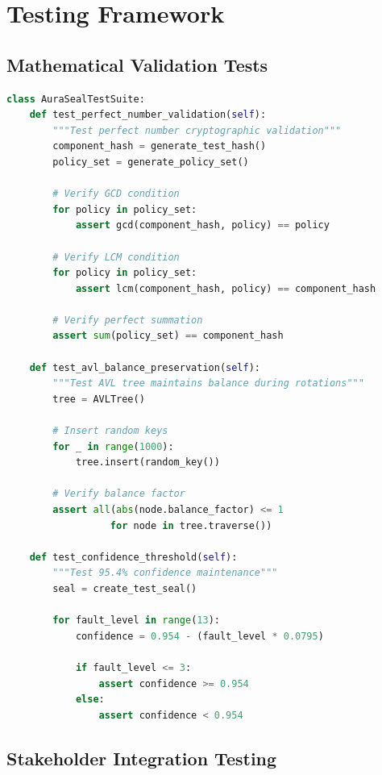 \documentclass[12pt,a4paper]{report}
\theoremstyle{definition}
\begin{document}
\chapter{Testing Framework}

\section{Mathematical Validation Tests}

\begin{lstlisting}[language=Python, caption=Test Suite]
class AuraSealTestSuite:
    def test_perfect_number_validation(self):
        """Test perfect number cryptographic validation"""
        component_hash = generate_test_hash()
        policy_set = generate_policy_set()
        
        # Verify GCD condition
        for policy in policy_set:
            assert gcd(component_hash, policy) == policy
            
        # Verify LCM condition
        for policy in policy_set:
            assert lcm(component_hash, policy) == component_hash
            
        # Verify perfect summation
        assert sum(policy_set) == component_hash
        
    def test_avl_balance_preservation(self):
        """Test AVL tree maintains balance during rotations"""
        tree = AVLTree()
        
        # Insert random keys
        for _ in range(1000):
            tree.insert(random_key())
            
        # Verify balance factor
        assert all(abs(node.balance_factor) <= 1 
                  for node in tree.traverse())
                  
    def test_confidence_threshold(self):
        """Test 95.4% confidence maintenance"""
        seal = create_test_seal()
        
        for fault_level in range(13):
            confidence = 0.954 - (fault_level * 0.0795)
            
            if fault_level <= 3:
                assert confidence >= 0.954
            else:
                assert confidence < 0.954
\end{lstlisting}

\section{Stakeholder Integration Testing}
\end{document}
